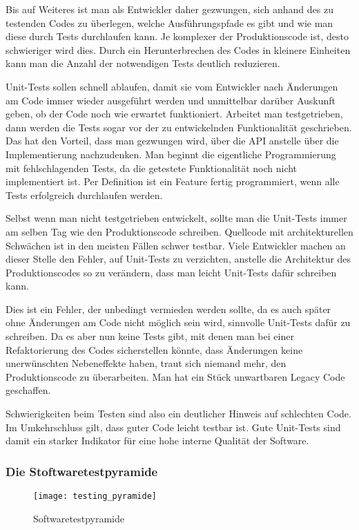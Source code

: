 Bis auf Weiteres ist man als Entwickler daher gezwungen, sich anhand des zu testenden Codes zu überlegen, welche Ausführungspfade es gibt und wie man diese durch Tests durchlaufen kann. Je komplexer der Produktionscode ist, desto schwieriger wird dies. Durch ein Herunterbrechen des Codes in kleinere Einheiten kann man die Anzahl der notwendigen Tests deutlich reduzieren.

Unit-Tests sollen schnell ablaufen, damit sie vom Entwickler nach Änderungen am Code immer wieder ausgeführt werden und unmittelbar darüber Auskunft geben, ob der Code noch wie erwartet funktioniert. Arbeitet man testgetrieben, dann werden die Tests sogar vor der zu entwickelnden Funktionalität geschrieben. Das hat den Vorteil, dass man gezwungen wird, über die API anstelle über die Implementierung nachzudenken. Man beginnt die eigentliche Programmierung mit fehlschlagenden Tests, da die getestete Funktionalität noch nicht implementiert ist. Per Definition ist ein Feature fertig programmiert, wenn alle Tests erfolgreich durchlaufen werden.

Selbst wenn man nicht testgetrieben entwickelt, sollte man die Unit-Tests immer am selben Tag wie den Produktionscode schreiben. Quellcode mit architekturellen Schwächen ist in den meisten Fällen schwer testbar. Viele Entwickler machen an dieser Stelle den Fehler, auf Unit-Tests zu verzichten, anstelle die Architektur des Produktionscodes so zu verändern, dass man leicht Unit-Tests dafür schreiben kann.

Dies ist ein Fehler, der unbedingt vermieden werden sollte, da es auch später ohne Änderungen am Code nicht möglich sein wird, sinnvolle Unit-Tests dafür zu schreiben. Da es aber nun keine Tests gibt, mit denen man bei einer Refaktorierung des Codes sicherstellen könnte, dass Änderungen keine unerwünschten Nebeneffekte haben, traut sich niemand mehr, den Produktionscode zu überarbeiten. Man hat ein Stück unwartbaren Legacy Code geschaffen.

Schwierigkeiten beim Testen sind also ein deutlicher Hinweis auf schlechten Code. Im Umkehrschluss
gilt, dass guter Code leicht testbar ist. Gute Unit-Tests sind damit ein starker Indikator für eine hohe interne Qualität der Software.

\subsubsection{Die Stoftwaretestpyramide}

\begin{figure}[H]
    \begin{center}
        \texttt{[image: testing\_pyramide]}
        \caption{Softwaretestpyramide}
        \label{[softwaretestpyramide]}
    \end{center}
\end{figure}

